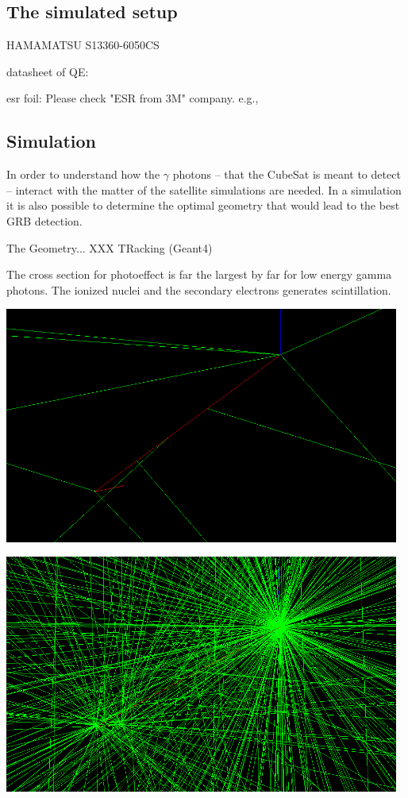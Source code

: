 \documentclass[12pt, a4paper,titlepage]{article}
\numberwithin{equation}{section}
\numberwithin{figure}{section}
\begin{document}
\subsection{The simulated setup}


HAMAMATSU S13360-6050CS

datasheet of QE:

esr foil:
Please check "ESR from 3M" company. e.g.,

\subsection{Simulation}

In order to understand how the $\gamma$ photons -- that the CubeSat is meant to detect -- interact with the matter of the satellite simulations are needed. In a simulation it is also possible to determine the optimal geometry that would lead to the best GRB detection. 

The Geometry... XXX TRacking (Geant4) 


The cross section for photoeffect is far the largest by far for low energy gamma photons.
The ionized nuclei and the secondary electrons generates scintillation.

\includegraphics[width=130.0mm]{images/secondary.png}


\includegraphics[width=130.0mm]{images/secondary2.png}
\end{document}
